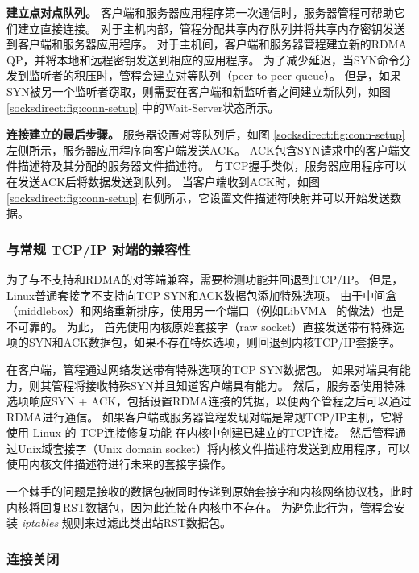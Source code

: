 \textbf {建立点对点队列。}
客户端和服务器应用程序第一次通信时，服务器管程可帮助它们建立直接连接。
对于主机内部，管程分配共享内存队列并将共享内存密钥发送到客户端和服务器应用程序。
对于主机间，客户端和服务器管程建立新的RDMA QP，并将本地和远程密钥发送到相应的应用程序。
为了减少延迟，当SYN命令分发到监听者的积压时，管程会建立对等队列（peer-to-peer queue）。
但是，如果SYN被另一个监听者窃取，则需要在客户端和新监听者之间建立新队列，如图 \ref {socksdirect:fig:conn-setup} 中的Wait-Server状态所示。

\textbf {连接建立的最后步骤。}
服务器设置对等队列后，如图 \ref {socksdirect:fig:conn-setup} 左侧所示，服务器应用程序向客户端发送ACK。 ACK包含SYN请求中的客户端文件描述符及其分配的服务器文件描述符。
与TCP握手类似，服务器应用程序可以在发送ACK后将数据发送到队列。
当客户端收到ACK时，如图 \ref {socksdirect:fig:conn-setup} 右侧所示，它设置文件描述符映射并可以开始发送数据。


\subsubsection{与常规 TCP/IP 对端的兼容性}


为了与不支持\sys {}和RDMA的对等端兼容，需要检测\sys {}功能并回退到TCP/IP。
但是，Linux普通套接字不支持向TCP SYN和ACK数据包添加特殊选项。
由于中间盒（middlebox）和网络重新排序，使用另一个端口（例如LibVMA~ \cite {libvma} 的做法）也是不可靠的。
为此，\libipc{} 首先使用内核原始套接字（raw socket）直接发送带有特殊选项的SYN和ACK数据包，如果不存在特殊选项，则回退到内核TCP/IP套接字。

在客户端，管程通过网络发送带有特殊选项的TCP SYN数据包。
如果对端具有\sys {}能力，则其管程将接收特殊SYN并且知道客户端具有\sys {}能力。
然后，服务器使用特殊选项响应SYN + ACK，包括设置RDMA连接的凭据，以便两个管程之后可以通过RDMA进行通信。
如果客户端或服务器管程发现对端是常规TCP/IP主机，它将使用 Linux 的 TCP连接修复功能 \cite {tcp-connection-repair} 在内核中创建已建立的TCP连接。
然后管程通过Unix域套接字（Unix domain socket）将内核文件描述符发送到应用程序，\libipc {}可以使用内核文件描述符进行未来的套接字操作。


一个棘手的问题是接收的数据包被同时传递到原始套接字和内核网络协议栈，此时内核将回复RST数据包，因为此连接在内核中不存在。
为避免此行为，管程会安装 \emph {iptables} 规则来过滤此类出站RST数据包。



\subsubsection{连接关闭}




